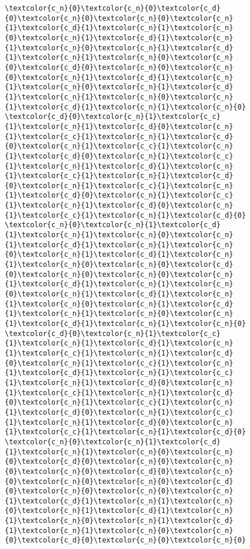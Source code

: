 \begin{figure}[!h]
\begin{BVerbatim}[commandchars=\\\{\},codes={\catcode`=3\catcode`^=7\catcode`_=8}]
\textcolor{c_n}{0}\textcolor{c_n}{0}\textcolor{c_d}{0}\textcolor{c_n}{0}\textcolor{c_n}{0}\textcolor{c_n}{1}\textcolor{c_d}{1}\textcolor{c_n}{1}\textcolor{c_n}{0}\textcolor{c_n}{1}\textcolor{c_d}{1}\textcolor{c_n}{1}\textcolor{c_n}{0}\textcolor{c_n}{1}\textcolor{c_d}{1}\textcolor{c_n}{1}\textcolor{c_n}{0}\textcolor{c_n}{0}\textcolor{c_d}{0}\textcolor{c_n}{0}\textcolor{c_n}{0}\textcolor{c_n}{1}\textcolor{c_d}{1}\textcolor{c_n}{1}\textcolor{c_n}{0}\textcolor{c_n}{1}\textcolor{c_d}{1}\textcolor{c_n}{1}\textcolor{c_n}{0}\textcolor{c_n}{1}\textcolor{c_d}{1}\textcolor{c_n}{1}\textcolor{c_n}{0}
\textcolor{c_d}{0}\textcolor{c_n}{1}\textcolor{c_c}{1}\textcolor{c_n}{1}\textcolor{c_d}{0}\textcolor{c_n}{1}\textcolor{c_c}{1}\textcolor{c_n}{1}\textcolor{c_d}{0}\textcolor{c_n}{1}\textcolor{c_c}{1}\textcolor{c_n}{1}\textcolor{c_d}{0}\textcolor{c_n}{1}\textcolor{c_c}{1}\textcolor{c_n}{1}\textcolor{c_d}{1}\textcolor{c_n}{1}\textcolor{c_c}{1}\textcolor{c_n}{1}\textcolor{c_d}{0}\textcolor{c_n}{1}\textcolor{c_c}{1}\textcolor{c_n}{1}\textcolor{c_d}{0}\textcolor{c_n}{1}\textcolor{c_c}{1}\textcolor{c_n}{1}\textcolor{c_d}{0}\textcolor{c_n}{1}\textcolor{c_c}{1}\textcolor{c_n}{1}\textcolor{c_d}{0}
\textcolor{c_n}{0}\textcolor{c_n}{1}\textcolor{c_d}{1}\textcolor{c_n}{1}\textcolor{c_n}{0}\textcolor{c_n}{1}\textcolor{c_d}{1}\textcolor{c_n}{1}\textcolor{c_n}{0}\textcolor{c_n}{1}\textcolor{c_d}{1}\textcolor{c_n}{1}\textcolor{c_n}{0}\textcolor{c_n}{0}\textcolor{c_d}{0}\textcolor{c_n}{0}\textcolor{c_n}{0}\textcolor{c_n}{1}\textcolor{c_d}{1}\textcolor{c_n}{1}\textcolor{c_n}{0}\textcolor{c_n}{1}\textcolor{c_d}{1}\textcolor{c_n}{1}\textcolor{c_n}{0}\textcolor{c_n}{1}\textcolor{c_d}{1}\textcolor{c_n}{1}\textcolor{c_n}{0}\textcolor{c_n}{1}\textcolor{c_d}{1}\textcolor{c_n}{1}\textcolor{c_n}{0}
\textcolor{c_d}{0}\textcolor{c_n}{1}\textcolor{c_c}{1}\textcolor{c_n}{1}\textcolor{c_d}{1}\textcolor{c_n}{1}\textcolor{c_c}{1}\textcolor{c_n}{1}\textcolor{c_d}{0}\textcolor{c_n}{1}\textcolor{c_c}{1}\textcolor{c_n}{1}\textcolor{c_d}{1}\textcolor{c_n}{1}\textcolor{c_c}{1}\textcolor{c_n}{1}\textcolor{c_d}{0}\textcolor{c_n}{1}\textcolor{c_c}{1}\textcolor{c_n}{1}\textcolor{c_d}{0}\textcolor{c_n}{1}\textcolor{c_c}{1}\textcolor{c_n}{1}\textcolor{c_d}{0}\textcolor{c_n}{1}\textcolor{c_c}{1}\textcolor{c_n}{1}\textcolor{c_d}{0}\textcolor{c_n}{1}\textcolor{c_c}{1}\textcolor{c_n}{1}\textcolor{c_d}{0}
\textcolor{c_n}{0}\textcolor{c_n}{1}\textcolor{c_d}{1}\textcolor{c_n}{1}\textcolor{c_n}{0}\textcolor{c_n}{0}\textcolor{c_d}{0}\textcolor{c_n}{0}\textcolor{c_n}{0}\textcolor{c_n}{0}\textcolor{c_d}{0}\textcolor{c_n}{0}\textcolor{c_n}{0}\textcolor{c_n}{0}\textcolor{c_d}{0}\textcolor{c_n}{0}\textcolor{c_n}{0}\textcolor{c_n}{1}\textcolor{c_d}{1}\textcolor{c_n}{1}\textcolor{c_n}{0}\textcolor{c_n}{1}\textcolor{c_d}{1}\textcolor{c_n}{1}\textcolor{c_n}{0}\textcolor{c_n}{1}\textcolor{c_d}{1}\textcolor{c_n}{1}\textcolor{c_n}{0}\textcolor{c_n}{0}\textcolor{c_d}{0}\textcolor{c_n}{0}\textcolor{c_n}{0}

\end{BVerbatim}
\end{figure}

